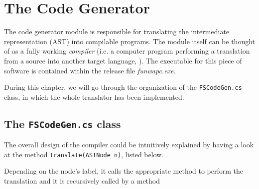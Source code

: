 
\chapter{\label{chapter4} The \fsharp Code Generator}

The code generator module is responsible for translating the \fwap intermediate representation (AST) into compilable \fsharp programs. The module itself can be thought of as a fully working \textit{compiler} (i.e. a computer program performing a translation from a source into another target language, \cite{dragon}). The executable for this piece of software is contained within the release file \textit{funwapc.exe}. 

During this chapter, we will go through the organization of the \texttt{FSCodeGen.cs} class, in which the whole translator has been implemented.

\section{The \texttt{FSCodeGen.cs} class}

The overall design of the compiler could be intuitively explained by having a look at the method \texttt{translate(ASTNode n)}, listed below. 




Depending on the node's label, it calls the appropriate method to perform the translation and it is recursively called by a method 

